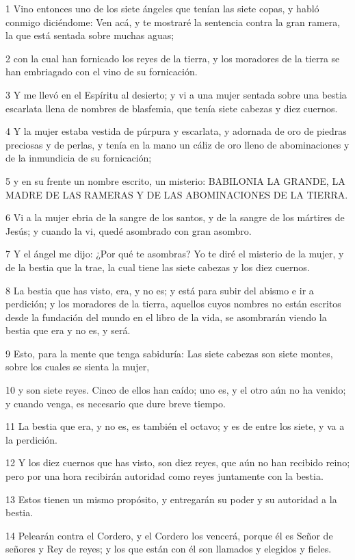 \par 1 Vino entonces uno de los siete ángeles que tenían las siete copas, y habló conmigo diciéndome: Ven acá, y te mostraré la sentencia contra la gran ramera, la que está sentada sobre muchas aguas;
\par 2 con la cual han fornicado los reyes de la tierra, y los moradores de la tierra se han embriagado con el vino de su fornicación.
\par 3 Y me llevó en el Espíritu al desierto; y vi a una mujer sentada sobre una bestia escarlata llena de nombres de blasfemia, que tenía siete cabezas y diez cuernos.
\par 4 Y la mujer estaba vestida de púrpura y escarlata, y adornada de oro de piedras preciosas y de perlas, y tenía en la mano un cáliz de oro lleno de abominaciones y de la inmundicia de su fornicación;
\par 5 y en su frente un nombre escrito, un misterio: BABILONIA LA GRANDE, LA MADRE DE LAS RAMERAS Y DE LAS ABOMINACIONES DE LA TIERRA.
\par 6 Vi a la mujer ebria de la sangre de los santos, y de la sangre de los mártires de Jesús; y cuando la vi, quedé asombrado con gran asombro.
\par 7 Y el ángel me dijo: ¿Por qué te asombras? Yo te diré el misterio de la mujer, y de la bestia que la trae, la cual tiene las siete cabezas y los diez cuernos.
\par 8 La bestia que has visto, era, y no es; y está para subir del abismo e ir a perdición; y los moradores de la tierra, aquellos cuyos nombres no están escritos desde la fundación del mundo en el libro de la vida, se asombrarán viendo la bestia que era y no es, y será.
\par 9 Esto, para la mente que tenga sabiduría: Las siete cabezas son siete montes, sobre los cuales se sienta la mujer,
\par 10 y son siete reyes. Cinco de ellos han caído; uno es, y el otro aún no ha venido; y cuando venga, es necesario que dure breve tiempo.
\par 11 La bestia que era, y no es, es también el octavo; y es de entre los siete, y va a la perdición.
\par 12 Y los diez cuernos que has visto, son diez reyes, que aún no han recibido reino; pero por una hora recibirán autoridad como reyes juntamente con la bestia.
\par 13 Estos tienen un mismo propósito, y entregarán su poder y su autoridad a la bestia.
\par 14 Pelearán contra el Cordero, y el Cordero los vencerá, porque él es Señor de señores y Rey de reyes; y los que están con él son llamados y elegidos y fieles.
